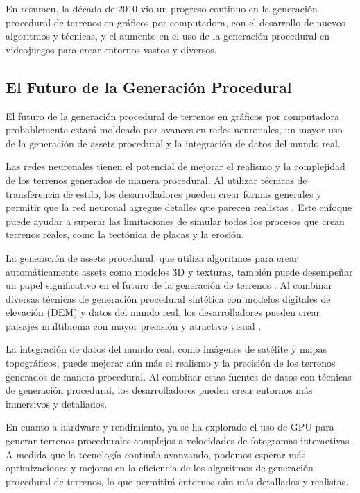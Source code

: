 En resumen, la década de 2010 vio un progreso continuo en la generación procedural de terrenos en gráficos por computadora, con el desarrollo de nuevos algoritmos y técnicas, y el aumento en el uso de la generación procedural en videojuegos para crear entornos vastos y diversos.

\subsection{El Futuro de la Generación Procedural}

El futuro de la generación procedural de terrenos en gráficos por computadora probablemente estará moldeado por avances en redes neuronales, un mayor uso de la generación de assets procedural y la integración de datos del mundo real.

Las redes neuronales tienen el potencial de mejorar el realismo y la complejidad de los terrenos generados de manera procedural. Al utilizar técnicas de transferencia de estilo, los desarrolladores pueden crear formas generales y permitir que la red neuronal agregue detalles que parecen realistas \cite{StyleTransfer}. Este enfoque puede ayudar a superar las limitaciones de simular todos los procesos que crean terrenos reales, como la tectónica de placas y la erosión.

La generación de assets procedural, que utiliza algoritmos para crear automáticamente assets como modelos 3D y texturas, también puede desempeñar un papel significativo en el futuro de la generación de terrenos \cite{ProceduralAssetGeneration}. Al combinar diversas técnicas de generación procedural sintética con modelos digitales de elevación (DEM) y datos del mundo real, los desarrolladores pueden crear paisajes multibioma con mayor precisión y atractivo visual \cite{RealWorldDataTerrain}.

La integración de datos del mundo real, como imágenes de satélite y mapas topográficos, puede mejorar aún más el realismo y la precisión de los terrenos generados de manera procedural. Al combinar estas fuentes de datos con técnicas de generación procedural, los desarrolladores pueden crear entornos más inmersivos y detallados.

En cuanto a hardware y rendimiento, ya se ha explorado el uso de GPU para generar terrenos procedurales complejos a velocidades de fotogramas interactivas \cite{proceduralTerrainGpu}. A medida que la tecnología continúa avanzando, podemos esperar más optimizaciones y mejoras en la eficiencia de los algoritmos de generación procedural de terrenos, lo que permitirá entornos aún más detallados y realistas.

